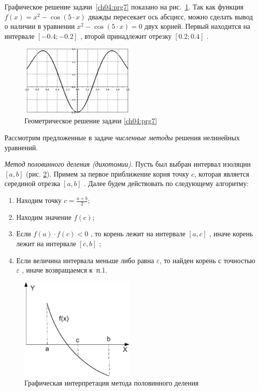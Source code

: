 Графическое решение задачи~\ref{ch04:prg7} показано на рис.~\ref{ch04:refDrawing1}. 
Так как функция  $f(x)=x^2-\cos (5\cdot x)$
 дважды пересекает ось абсцисс, можно сделать вывод о наличии  в уравнении  $x^2-\cos (5\cdot x)=0$  двух корней.
Первый находится на интервале  $[-0.4;-0.2]$ , второй принадлежит отрезку  $[0.2;0.4]$ .

\begin{figure}[htb]
\begin{center}
\includegraphics[width=0.5\textwidth]{img/ris_4_2}
\caption{Геометрическое решение задачи \ref{ch04:prg7}}
\label{ch04:refDrawing1}
\end{center}
\end{figure}

Рассмотрим предложенные в задаче \emph{численные методы} решения нелинейных уравнений.

\emph{Метод половинного деления (дихотомии)}. Пусть был выбран интервал изоляции  $[a,b]$  (рис.
\ref{ch04:refDrawing2}). Примем за первое приближение корня точку $c$, которая является серединой отрезка 
$[a,b]$ . Далее будем действовать по следующему алгоритму:
\begin{enumerate}
\item Находим точку  $c=\frac{a+b}{2}$;
\item Находим значение  $f(c)$;
\item Если  $f(a)\cdot f(c)<0$ , то корень лежит на интервале  $[a,c]$ , иначе корень лежит на интервале  $[c,b]$ ;
\item Если величина интервала меньше либо равна  $\varepsilon$, то найден корень с точностью  $\varepsilon$ , иначе
возвращаемся к~п.1.
\end{enumerate}

\begin{figure}[htb]
\begin{center}
\includegraphics[width=0.5\textwidth]{img/ris_4_3}
\caption{Графическая интерпретация метода половинного деления}
\label{ch04:refDrawing2}
\end{center}
\end{figure}

